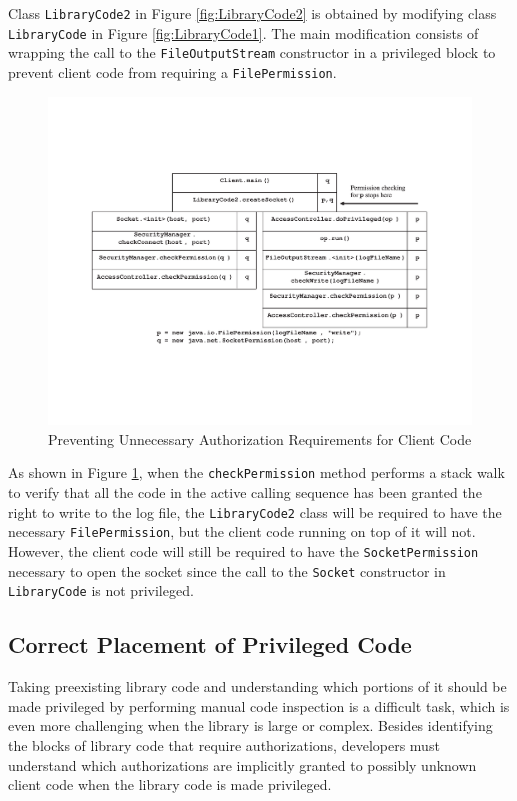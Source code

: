 Class \texttt{LibraryCode2} in Figure \ref{fig:LibraryCode2} is
obtained by modifying class \verb"LibraryCode" in Figure
\ref{fig:LibraryCode1}. The main modification consists of wrapping
the call to the \texttt{FileOutputStream} constructor in a
privileged block to prevent client code from requiring a
\verb"FilePermission".

\begin{figure}[h]
	\centering
\includegraphics[scale=0.4]{pistoia-figure2-eps-converted-to.pdf}
	\caption{Preventing Unnecessary Authorization Requirements for Client Code}
	\label{fig:withDoPriv}
\end{figure}

As shown in Figure \ref{fig:withDoPriv}, when the
\verb"checkPermission" method performs a stack walk to verify that
all the code in the active calling sequence has been granted the
right to write to the log file, the \verb"LibraryCode2" class will
be required to have the necessary \verb"FilePermission", but the
client code running on top of it will not.  However, the client
code will still be required to have the \verb"SocketPermission"
necessary to open the socket since the call to the \verb"Socket"
constructor in \verb"LibraryCode" is not privileged.

\subsection{Correct Placement of Privileged Code}
Taking preexisting library code and understanding which portions
of it should be made privileged by performing manual code
inspection is a difficult task, which is even more challenging
when the library is large or complex. Besides identifying the
blocks of library code that require authorizations, developers
must understand which authorizations are implicitly granted to
possibly unknown client code when the library code is made
privileged.

